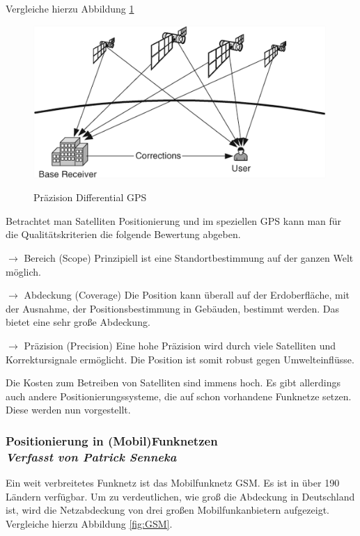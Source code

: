 Vergleiche hierzu Abbildung \ref{fig:DGPS}
\begin{figure}[h]
\centering
\includegraphics[width=0.99\textwidth]{ref/images/DGPS.PNG}
\caption[Präzision Differential GPS]{Präzision Differential GPS}
\label{fig:DGPS}
\cite[S. 196]{Schiller2004}
\end{figure}

Betrachtet man Satelliten Positionierung und im speziellen GPS kann man für die Qualitätskriterien die folgende Bewertung abgeben.

$\longrightarrow$ Bereich (Scope) Prinzipiell ist eine Standortbestimmung auf der ganzen Welt möglich.

$\longrightarrow$ Abdeckung (Coverage) Die Position kann überall auf der Erdoberfläche, mit der Ausnahme, der Positionsbestimmung in Gebäuden, bestimmt werden. Das bietet eine sehr große Abdeckung.

$\longrightarrow$ Präzision (Precision) Eine hohe Präzision wird durch viele Satelliten und Korrektursignale ermöglicht. Die Position ist somit  robust gegen Umwelteinflüsse.

\cite[S. 187]{Schiller2004}

Die Kosten zum Betreiben von Satelliten sind immens hoch. Es gibt allerdings auch andere Positionierungssysteme, die auf schon vorhandene Funknetze setzen. Diese werden nun vorgestellt.

\subsubsection[Positionierung in (Mobil)Funknetzen]{Positionierung in (Mobil)Funknetzen
 \\ \textnormal{\small{\textit {Verfasst von Patrick Senneka}}}}

Ein weit verbreitetes Funknetz ist das Mobilfunknetz GSM. Es ist in über 190 Ländern verfügbar.\cite[206]{Schiller2004} Um zu verdeutlichen, wie groß die Abdeckung in Deutschland ist, wird die Netzabdeckung von drei großen Mobilfunkanbietern aufgezeigt. Vergleiche hierzu Abbildung \ref{fig:GSM}.

